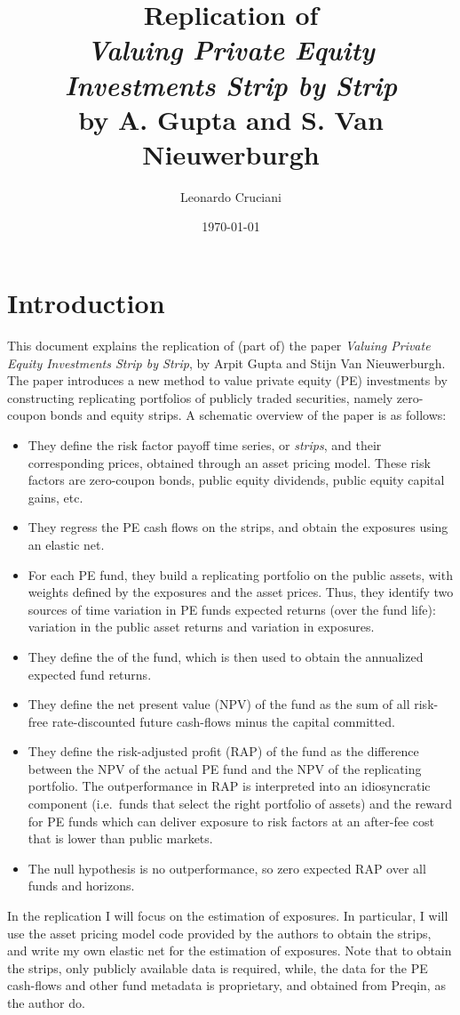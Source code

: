 \documentclass[12pt]{article}
\title{Replication of\\\textit{Valuing Private Equity Investments Strip by Strip} \\by A. Gupta and S. Van Nieuwerburgh}
\author{Leonardo Cruciani}
\date{\today}
\begin{document}
\maketitle

\section{Introduction}\label{sec:introduction}
This document explains the replication of (part of) the paper \textit{Valuing Private Equity Investments Strip by Strip}, by Arpit Gupta and Stijn Van Nieuwerburgh.
The paper introduces a new method to value private equity (PE) investments by constructing replicating portfolios of publicly traded securities, namely zero-coupon bonds and equity strips.
A schematic overview of the paper is as follows:
\begin{itemize}
    \item They define the risk factor payoff time series, or \textit{strips}, and their corresponding prices, obtained through an asset pricing model.
    These risk factors are zero-coupon bonds, public equity dividends, public equity capital gains, etc.
    \item They regress the PE cash flows on the strips, and obtain the exposures using an elastic net.
    \item For each PE fund, they build a replicating portfolio on the public assets, with weights defined by the exposures and the asset prices.
    Thus, they identify two sources of time variation in PE funds expected returns (over the fund life): variation in the public asset returns and variation in exposures.
    \item They define the  of the fund, which is then used to obtain the annualized expected fund returns.
    \item They define the net present value (NPV) of the fund as the sum of all risk-free rate-discounted future cash-flows minus the capital committed.
    \item They define the risk-adjusted profit (RAP) of the fund as the difference between the NPV of the actual PE fund and the NPV of the replicating portfolio.
    The outperformance in RAP is interpreted into an idiosyncratic component (i.e.\ funds that select the right portfolio of assets) and the reward for PE funds which can deliver exposure to risk factors at an after-fee cost that is lower than public markets.
    \item The null hypothesis is no outperformance, so zero expected RAP over all funds and horizons.
\end{itemize}
In the replication I will focus on the estimation of exposures.
In particular, I will use the asset pricing model code provided by the authors to obtain the strips, and write my own elastic net for the estimation of exposures.
Note that to obtain the strips, only publicly available data is required, while, the data for the PE cash-flows and other fund metadata is proprietary, and obtained from Preqin, as the author do.
\end{document}
